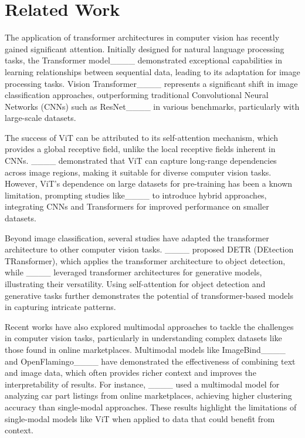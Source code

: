 \section{Related Work}
The application of transformer architectures in computer vision has recently gained significant attention. Initially designed for natural language processing tasks, the Transformer model____ demonstrated exceptional capabilities in learning relationships between sequential data, leading to its adaptation for image processing tasks. Vision Transformer____ represents a significant shift in image classification approaches, outperforming traditional Convolutional Neural Networks (CNNs) such as ResNet____ in various benchmarks, particularly with large-scale datasets.

The success of ViT can be attributed to its self-attention mechanism, which provides a global receptive field, unlike the local receptive fields inherent in CNNs. ____ demonstrated that ViT can capture long-range dependencies across image regions, making it suitable for diverse computer vision tasks. However, ViT's dependence on large datasets for pre-training has been a known limitation, prompting studies like____ to introduce hybrid approaches, integrating CNNs and Transformers for improved performance on smaller datasets.

Beyond image classification, several studies have adapted the transformer architecture to other computer vision tasks. ____ proposed DETR (DEtection TRansformer), which applies the transformer architecture to object detection, while ____ leveraged transformer architectures for generative models, illustrating their versatility. Using self-attention for object detection and generative tasks further demonstrates the potential of transformer-based models in capturing intricate patterns.

Recent works have also explored multimodal approaches to tackle the challenges in computer vision tasks, particularly in understanding complex datasets like those found in online marketplaces. Multimodal models like ImageBind____ and OpenFlamingo____ have demonstrated the effectiveness of combining text and image data, which often provides richer context and improves the interpretability of results. For instance, ____ used a multimodal model for analyzing car part listings from online marketplaces, achieving higher clustering accuracy than single-modal approaches. These results highlight the limitations of single-modal models like ViT when applied to data that could benefit from context.

